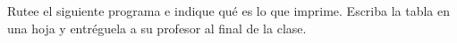 Rutee el siguiente programa
e indique qué es lo que imprime.
Escriba la tabla en una hoja
y entréguela a su profesor al final de la clase.

\begin{minipage}[T]{.5\textwidth}
  
\end{minipage}
